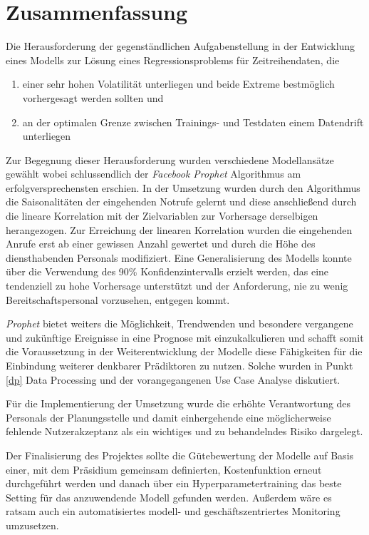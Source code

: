 \chapter{Zusammenfassung}

Die Herausforderung der gegenständlichen Aufgabenstellung in der Entwicklung eines Modells zur Lösung eines Regressionsproblems für Zeitreihendaten, die 

\begin{enumerate}
 \itemsep-8pt
 \item einer sehr hohen Volatilität unterliegen und beide Extreme bestmöglich vorhergesagt werden sollten und
 \item an der optimalen Grenze zwischen Trainings- und Testdaten einem Datendrift unterliegen
\end{enumerate}

Zur Begegnung dieser Herausforderung wurden verschiedene Modellansätze gewählt wobei schlussendlich der \textit{Facebook Prophet} Algorithmus am erfolgversprechensten erschien. In der Umsetzung wurden durch den Algorithmus die Saisonalitäten der eingehenden Notrufe gelernt und diese anschließend durch die lineare Korrelation mit der Zielvariablen zur Vorhersage derselbigen herangezogen. Zur Erreichung der linearen Korrelation wurden die eingehenden Anrufe erst ab einer  gewissen Anzahl gewertet und durch die Höhe des diensthabenden Personals modifiziert. Eine Generalisierung des Modells konnte über die Verwendung des 90\% Konfidenzintervalls erzielt werden, das eine tendenziell zu hohe Vorhersage unterstützt und der Anforderung, nie zu wenig Bereitschaftspersonal vorzusehen, entgegen kommt.

\textit{Prophet} bietet weiters die Möglichkeit, Trendwenden und besondere vergangene und zukünftige Ereignisse in eine Prognose mit einzukalkulieren und schafft somit die Voraussetzung in der Weiterentwicklung der Modelle diese Fähigkeiten für die Einbindung weiterer denkbarer Prädiktoren zu nutzen. Solche wurden in Punkt \ref{dp} Data Processing und der vorangegangenen Use Case Analyse diskutiert.

Für die Implementierung der Umsetzung wurde die erhöhte Verantwortung des Personals der Planungsstelle und damit einhergehende eine möglicherweise fehlende Nutzerakzeptanz als ein wichtiges und zu behandelndes Risiko dargelegt.

Der Finalisierung des Projektes sollte die Gütebewertung der Modelle auf Basis einer, mit dem Präsidium gemeinsam definierten, Kostenfunktion erneut durchgeführt werden und danach über ein Hyperparametertraining das beste Setting für das anzuwendende Modell gefunden werden. Außerdem wäre es ratsam auch ein automatisiertes modell- und geschäftszentriertes Monitoring umzusetzen. 